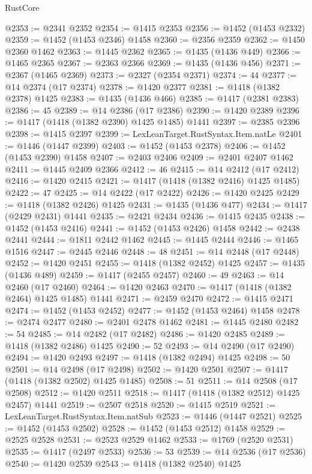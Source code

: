 \begin{lexlean}{RustCore}
\begin{coremodule}
@2353 := @2341 @2352
@2354 := @1415 @2353
@2356 := @1452 (@1453 @2332)
@2359 := @1452 (@1453 @2346) @1458
@2360 := @2356 @2359
@2362 := @1450 @2360 @1462
@2363 := @1445 @2362
@2365 := @1435 (@1436 @449)
@2366 := @1465 @2365
@2367 := @2363 @2366
@2369 := @1435 (@1436 @456)
@2371 := @2367 (@1465 @2369)
@2373 := @2327 (@2354 @2371)
@2374 := 44
@2377 := @14 @2374 (@17 @2374)
@2378 := @1420 @2377
@2381 := @1418 (@1382 @2378) @1425
@2383 := @1435 (@1436 @466)
@2385 := @1417 (@2381 @2383)
@2386 := 45
@2389 := @14 @2386 (@17 @2386)
@2390 := @1420 @2389
@2396 := @1417 (@1418 (@1382 @2390) @1425 @1485) @1441
@2397 := @2385 @2396
@2398 := @1415 @2397
@2399 := LexLeanTarget.RustSyntax.Item.natLe
@2401 := @1446 (@1447 @2399)
@2403 := @1452 (@1453 @2378)
@2406 := @1452 (@1453 @2390) @1458
@2407 := @2403 @2406
@2409 := @2401 @2407 @1462
@2411 := @1445 @2409 @2366
@2412 := 46
@2415 := @14 @2412 (@17 @2412)
@2416 := @1420 @2415
@2421 := @1417 (@1418 (@1382 @2416) @1425 @1485)
@2422 := 47
@2425 := @14 @2422 (@17 @2422)
@2426 := @1420 @2425
@2429 := @1418 (@1382 @2426) @1425
@2431 := @1435 (@1436 @477)
@2434 := @1417 (@2429 @2431) @1441
@2435 := @2421 @2434
@2436 := @1415 @2435
@2438 := @1452 (@1453 @2416)
@2441 := @1452 (@1453 @2426) @1458
@2442 := @2438 @2441
@2444 := @1811 @2442 @1462
@2445 := @1445 @2444
@2446 := @1465 @1516
@2447 := @2445 @2446
@2448 := 48
@2451 := @14 @2448 (@17 @2448)
@2452 := @1420 @2451
@2455 := @1418 (@1382 @2452) @1425
@2457 := @1435 (@1436 @489)
@2459 := @1417 (@2455 @2457)
@2460 := 49
@2463 := @14 @2460 (@17 @2460)
@2464 := @1420 @2463
@2470 := @1417 (@1418 (@1382 @2464) @1425 @1485) @1441
@2471 := @2459 @2470
@2472 := @1415 @2471
@2474 := @1452 (@1453 @2452)
@2477 := @1452 (@1453 @2464) @1458
@2478 := @2474 @2477
@2480 := @2401 @2478 @1462
@2481 := @1445 @2480
@2482 := 54
@2485 := @14 @2482 (@17 @2482)
@2486 := @1420 @2485
@2489 := @1418 (@1382 @2486) @1425
@2490 := 52
@2493 := @14 @2490 (@17 @2490)
@2494 := @1420 @2493
@2497 := @1418 (@1382 @2494) @1425
@2498 := 50
@2501 := @14 @2498 (@17 @2498)
@2502 := @1420 @2501
@2507 := @1417 (@1418 (@1382 @2502) @1425 @1485)
@2508 := 51
@2511 := @14 @2508 (@17 @2508)
@2512 := @1420 @2511
@2518 := @1417 (@1418 (@1382 @2512) @1425 @2457) @1441
@2519 := @2507 @2518
@2520 := @1415 @2519
@2521 := LexLeanTarget.RustSyntax.Item.natSub
@2523 := @1446 (@1447 @2521)
@2525 := @1452 (@1453 @2502)
@2528 := @1452 (@1453 @2512) @1458
@2529 := @2525 @2528
@2531 := @2523 @2529 @1462
@2533 := @1769 (@2520 @2531)
@2535 := @1417 (@2497 @2533)
@2536 := 53
@2539 := @14 @2536 (@17 @2536)
@2540 := @1420 @2539
@2543 := @1418 (@1382 @2540) @1425

\end{coremodule}
\end{lexlean}
